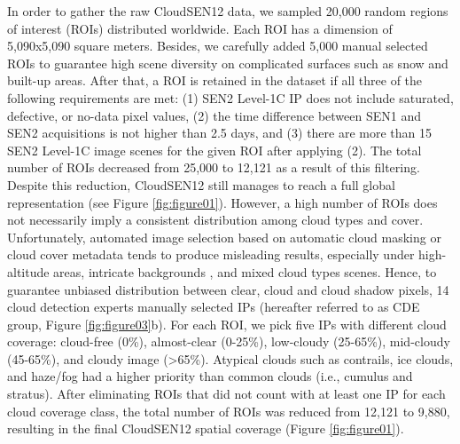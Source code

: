 \documentclass[a4paper, nobind]{templates/cdethesis}
\begin{document}
In order to gather the raw CloudSEN12 data, we sampled 20,000 random regions of interest (ROIs) distributed worldwide. Each ROI has a dimension of 5,090x5,090 square meters. Besides, we carefully added 5,000 manual selected ROIs to guarantee high scene diversity on complicated surfaces such as snow and built-up areas. After that, a ROI is retained in the dataset if all three of the following requirements are met: (1) SEN2 Level-1C IP does not include saturated, defective, or no-data pixel values, (2) the time difference between SEN1 and SEN2 acquisitions is not higher than 2.5 days, and (3) there are more than 15 SEN2 Level-1C image scenes for the given ROI after applying (2). The total number of ROIs decreased from 25,000 to 12,121 as a result of this filtering. Despite this reduction, CloudSEN12 still manages to reach a full global representation (see Figure \ref{fig:figure01}). However, a high number of ROIs does not necessarily imply a consistent distribution among cloud types and cover. Unfortunately, automated image selection based on automatic cloud masking or cloud cover metadata tends to produce misleading results, especially under high-altitude areas\cite{dirk2021}, intricate backgrounds \cite{Rittger2020}, and mixed cloud types scenes. Hence, to guarantee unbiased distribution between clear, cloud and cloud shadow pixels, 14 cloud detection experts manually selected IPs (hereafter referred to as CDE group, Figure \ref{fig:figure03}b). For each ROI, we pick five IPs with different cloud coverage: cloud-free (0\%), almost-clear (0-25\%), low-cloudy (25-65\%), mid-cloudy (45-65\%), and cloudy image (\textgreater65\%). Atypical clouds such as contrails, ice clouds, and haze/fog had a higher priority than common clouds (i.e., cumulus and stratus). After eliminating ROIs that did not count with at least one IP for each cloud coverage class, the total number of ROIs was reduced from 12,121 to 9,880, resulting in the final CloudSEN12 spatial coverage (Figure \ref{fig:figure01}).
\end{document}
